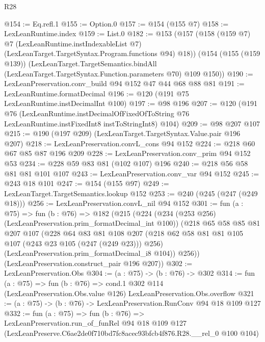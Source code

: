 \begin{lexlean}{R28}
\begin{coremodule}
@154 := Eq.refl.{1}
@155 := Option.{0}
@157 := @154 (@155 @7)
@158 := LexLeanRuntime.index
@159 := List.{0}
@182 := @153
    (@157
      (@158
        (@159 @7)
        @7
        (LexLeanRuntime.instIndexableList @7)
        (LexLeanTarget.TargetSyntax.Program.functions @94)
        @18))
    (@154
      (@155 (@159 @139))
      (LexLeanTarget.TargetSemantics.bindAll
        (LexLeanTarget.TargetSyntax.Function.parameters @70)
        @109
        @150))
@190 := LexLeanPreservation.conv_build @94 @152 @47 @44 @68 @88 @81
@191 := LexLeanRuntime.formatDecimal
@196 := @120 (@191 @75 LexLeanRuntime.instDecimalInt @100)
@197 := @98 @196
@207 := @120
    (@191
      @76
      (LexLeanRuntime.instDecimalOfFixedOfToString
        @76
        LexLeanRuntime.instFixedInt8
        instToStringInt8)
      @104)
@209 := @98 @207 @107
@215 := @190 (@197 @209) (LexLeanTarget.TargetSyntax.Value.pair @196 @207)
@218 := LexLeanPreservation.convL_cons @94 @152
@224 := @218 @60 @67 @85 @87 @196 @209
@228 := LexLeanPreservation.conv_prim @94 @152 @53
@234 := @228 @59 @83 @81 (@102 @107) @196
@240 := @218 @56 @58 @81 @81 @101 @107
@243 := LexLeanPreservation.conv_var @94 @152
@245 := @243 @18 @101
@247 := @154 (@155 @97)
@249 := LexLeanTarget.TargetSemantics.lookup @152
@253 := @240 (@245 (@247 (@249 @18)))
@256 := LexLeanPreservation.convL_nil @94 @152
@301 := fun (a : @75) =>
  fun (b : @76) =>
  @182
    (@215
      (@224
        (@234 (@253 @256) (LexLeanPreservation.prim_formatDecimal_int @100))
        (@218
          @65
          @58
          @85
          @81
          @207
          @107
          (@228
            @64
            @83
            @81
            @108
            @207
            (@218 @62 @58 @81 @81 @105 @107 (@243 @23 @105 (@247 (@249 @23))) @256)
            (LexLeanPreservation.prim_formatDecimal_i8 @104))
          @256))
      (LexLeanPreservation.construct_pair @196 @207))
@302 := LexLeanPreservation.Obs
@304 := (a : @75) -> (b : @76) -> @302
@314 := fun (a : @75) =>
  fun (b : @76) =>
  cond.{1} @302 @114 (LexLeanPreservation.Obs.value @126) LexLeanPreservation.Obs.overflow
@321 := (a : @75) -> (b : @76) -> LexLeanPreservation.RunConv @94 @18 @109 @127
@332 := fun (a : @75) =>
  fun (b : @76) =>
  LexLeanPreservation.run_of_funRel
    @94
    @18
    @109
    @127
    (LexLeanPreserve.C6ae2de0f710bd7fc8acec93bfcb4f876.R28.__rel_0 @100 @104)
\end{coremodule}
\end{lexlean}
